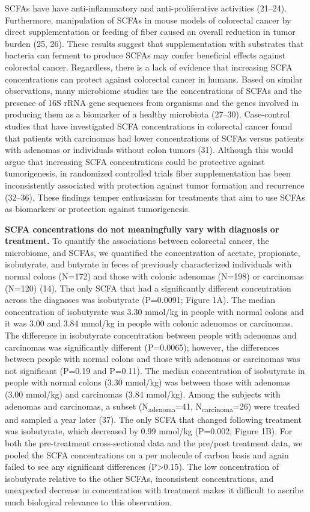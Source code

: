 \documentclass[11pt,]{article}
\begin{document}
SCFAs have have anti-inflammatory and anti-proliferative activities
(21--24). Furthermore, manipulation of SCFAs in mouse models of
colorectal cancer by direct supplementation or feeding of fiber caused
an overall reduction in tumor burden (25, 26). These results suggest
that supplementation with substrates that bacteria can ferment to
produce SCFAs may confer beneficial effects against colorectal cancer.
Regardless, there is a lack of evidence that increasing SCFA
concentrations can protect against colorectal cancer in humans. Based on
similar observations, many microbiome studies use the concentrations of
SCFAs and the presence of 16S rRNA gene sequences from organisms and the
genes involved in producing them as a biomarker of a healthy microbiota
(27--30). Case-control studies that have investigated SCFA
concentrations in colorectal cancer found that patients with carcinomas
had lower concentrations of SCFAs versus patients with adenomas or
individuals without colon tumors (31). Although this would argue that
increasing SCFA concentrations could be protective against
tumorigenesis, in randomized controlled trials fiber supplementation has
been inconsistently associated with protection against tumor formation
and recurrence (32--36). These findings temper enthusiasm for treatments
that aim to use SCFAs as biomarkers or protection against tumorigenesis.

\textbf{SCFA concentrations do not meaningfully vary with diagnosis or
treatment.} To quantify the associations between colorectal cancer, the
microbiome, and SCFAs, we quantified the concentration of acetate,
propionate, isobutyrate, and butyrate in feces of previously
characterized individuals with normal colons (N=172) and those with
colonic adenomas (N=198) or carcinomas (N=120) (14). The only SCFA that
had a significantly different concentration across the diagnoses was
isobutyrate (P=0.0091; Figure 1A). The median concentration of
isobutyrate was 3.30 mmol/kg in people with normal colons and it was
3.00 and 3.84 mmol/kg in people with colonic adenomas or carcinomas. The
difference in isobutyrate concentration between people with adenomas and
carcinomas was significantly different (P=0.0065); however, the
differences between people with normal colons and those with adenomas or
carcinomas was not significant (P=0.19 and P=0.11). The median
concentration of isobutyrate in people with normal colons (3.30 mmol/kg)
was between those with adenomas (3.00 mmol/kg) and carcinomas (3.84
mmol/kg). Among the subjects with adenomas and carcinomas, a subset
(N\textsubscript{adenoma}=41, N\textsubscript{carcinoma}=26) were
treated and sampled a year later (37). The only SCFA that changed
following treatment was isobutyrate, which decreased by 0.99 mmol/kg
(P=0.002; Figure 1B). For both the pre-treatment cross-sectional data
and the pre/post treatment data, we pooled the SCFA concentrations on a
per molecule of carbon basis and again failed to see any significant
differences (P\textgreater{}0.15). The low concentration of isobutyrate
relative to the other SCFAs, inconsistent concentrations, and unexpected
decrease in concentration with treatment makes it difficult to ascribe
much biological relevance to this observation.
\end{document}
